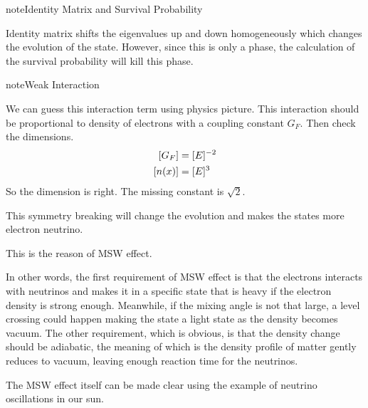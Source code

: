 \documentclass[letterpaper,12pt,english]{sphinxmanual}
\begin{document}
\begin{notice}{note}{Identity Matrix and Survival Probability}

Identity matrix shifts the eigenvalues up and down homogeneously which changes the evolution of the state. However, since this is only a phase, the calculation of the survival probability will kill this phase.
\end{notice}

\begin{notice}{note}{Weak Interaction}

We can guess this interaction term using physics picture. This interaction should be proportional to density of electrons with a coupling constant \(G_F\). Then check the dimensions.
\begin{gather}
\begin{split}[G_F] &= [E]^{-2} \\
[n(x)] & = [E]^3\end{split}\notag
\end{gather}
So the dimension is right. The missing constant is \(\sqrt{2}\).
\end{notice}

This symmetry breaking will change the evolution and makes the states more electron neutrino.

This is the reason of MSW effect.

In other words, the first requirement of MSW effect is that the electrons interacts with neutrinos and makes it in a specific state that is heavy if the electron density is strong enough. Meanwhile, if the mixing angle is not that large, a level crossing could happen making the state a light state as the density becomes vacuum. The other requirement, which is obvious, is that the density change should be adiabatic, the meaning of which is the density profile of matter gently reduces to vacuum, leaving enough reaction time for the neutrinos.

The MSW effect itself can be made clear using the example of neutrino oscillations in our sun.
\end{document}
